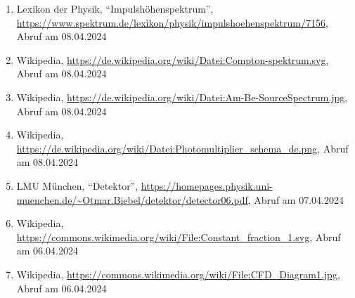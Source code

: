 \documentclass[12pt,a4paper]{scrartcl}
\numberwithin{equation}{section} %
\renewcommand{\[}{} %
\renewcommand{\]}{\noindent} %
\begin{document}
\begin{enumerate}
\item
  Lexikon der Physik, ``Impulshöhenspektrum'',
  \url{https://www.spektrum.de/lexikon/physik/impulshoehenspektrum/7156},
  Abruf am 08.04.2024
\item
  Wikipedia,
  \url{https://de.wikipedia.org/wiki/Datei:Compton-spektrum.svg},
  Abruf am 08.04.2024
\item
  Wikipedia,
  \url{https://de.wikipedia.org/wiki/Datei:Am-Be-SourceSpectrum.jpg},
  Abruf am 08.04.2024
\item
  Wikipedia,
  \url{https://de.wikipedia.org/wiki/Datei:Photomultiplier_schema_de.png},
  Abruf am 08.04.2024
\item
  LMU München, ``Detektor'',
  \url{https://homepages.physik.uni-muenchen.de/~Otmar.Biebel/detektor/detector06.pdf},
  Abruf am 07.04.2024
\item
  Wikipedia,
  \url{https://commons.wikimedia.org/wiki/File:Constant_fraction_1.svg},
  Abruf am 06.04.2024
\item
  Wikipedia,
  \url{https://commons.wikimedia.org/wiki/File:CFD_Diagram1.jpg},
  Abruf am 06.04.2024
\end{enumerate}
\end{document}
